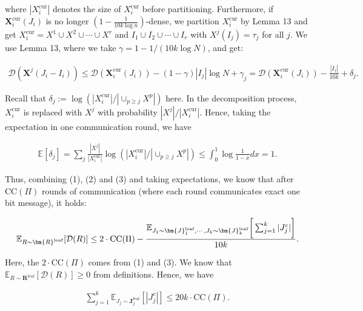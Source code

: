 where $|X_{i}^{\text{cur}}|$ denotes the size of $X_{i}^{\text{cur}}$ before partitioning. Furthermore, if $\bm{X}_{i}^{\text{cur}}(J_{i})$ is no longer $(1-\frac{1}{10k\log n})$-dense, we partition $X_{i}^{\text{cur}}$ by Lemma 13 and get $X_{i}^{\text{cur}}=X^{1}\cup X^{2}\cup\cdots\cup X^{r}$ and $I_{1}\cup I_{2}\cup\cdots\cup I_{r}$ with $X^{j}(I_{j})=\tau_{j}$ for all $j$. We use Lemma 13, where we take $\gamma=1-1/(10k\log N)$, and get:\par


\[\begin{gathered}
\mathcal{D}(\bm{X}^{j}(J_{i}-I_{i}))\leq\mathcal{D}(\bm{X}_{i}^{\text{cur}}(J_{i}))-(1-\gamma)|I_{j}|\log N+\gamma_{j}=\mathcal{D}(\bm{X}_{i}^{\text{cur}}(J_{i}))-\frac{|I_{j}|}{10k}+\delta_{j}.
\end{gathered}\]


Recall that $\delta_{j}:=\log(|X_{i}^{\text{cur}}|/|\cup_{p\geq j}X^{p}|)$ here. In the decomposition process, $X_{i}^{\text{cur}}$ is replaced with $X^{j}$ with probability $|X^{j}|/|X_{i}^{\text{cur}}|$. Hence, taking the expectation in one communication round, we have\par


\[\begin{gathered}
\mathbb{E}[\delta_{j}]=\sum_{j}\frac{|X^{j}|}{|X_{i}^{\text{cur}}|}\log(|X_{i}^{\text{cur}}|/|\cup_{p\geq j}X^{p}|)\leq\int_{0}^{1}\log\frac{1}{1-x}dx=1.
\end{gathered}\]


Thus, combining (1), (2) and (3) and taking expectations, we know that after $\text{CC}(\Pi)$ rounds of communication (where each round communicates exact one bit message), it holds:\par


\[\begin{gathered}
\mathbb{E}_{R\sim\bm{R}^{\text{leaf}}}[\mathcal{D}(R)]\leq 2\cdot\text{CC}(\Pi)-\frac{\mathbb{E}_{J_{1}\sim\bm{J}_{1}^{\text{leaf}},\cdots,J_{k}\sim\bm{J}_{k}^{\text{leaf}}}\bigg{[}\sum_{j=1}^{k}|J_{j}^{c}|\bigg{]}}{10k}.
\end{gathered}\]


Here, the $2\cdot\text{CC}(\Pi)$ comes from (1) and (3). We know that $\mathbb{E}_{R\sim\bm{R}^{\text{leaf}}}[\mathcal{D}(R)]\geq 0$ from definitions. Hence, we have\par


\[\begin{gathered}
\sum_{j=1}^{k}\mathbb{E}_{J_{j}\sim\bm{J}_{j}^{\text{leaf}}}[|J_{j}^{c}|]\leq 20k\cdot\text{CC}(\Pi).
\end{gathered}\]




